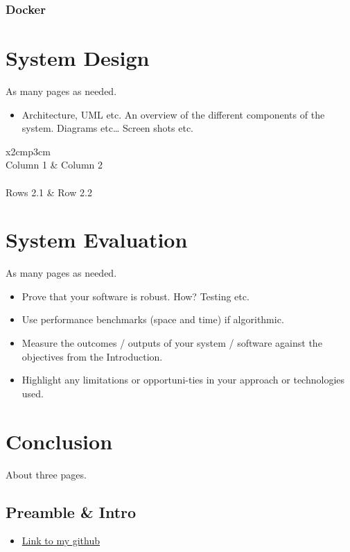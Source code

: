 \subsection{Docker}

\chapter{System Design}
As many pages as needed.
\begin{itemize}
\item Architecture, UML etc. An overview of the different components of the system. Diagrams etc… Screen shots etc.
\end{itemize}

\begin{table}[h]
  \centering
  \begin{tabular}{x{2cm}p{3cm}}
    \toprule \\
    Column 1 & Column 2 \\
    \midrule \\
    Rows 2.1 & Row 2.2 \\
    \bottomrule
  \end{tabular}
  \caption{A table.}
  \label{table:mytable}
\end{table}

\chapter{System Evaluation}
As many pages as needed.
\begin{itemize}
\item Prove that your software is robust. How? Testing etc.
\item Use performance benchmarks (space and time) if algorithmic.
\item Measure the outcomes / outputs of your system / software against the objectives from the Introduction.
\item Highlight any limitations or opportuni-ties in your approach or technologies used.
\end{itemize}

\chapter{Conclusion}
About three pages.
\begin{appendices}
\chapter{Preamble \& Intro}
\begin{itemize}
\item \href{https://github.com/Ultan-Kearns/AppliedProject}{Link to my github}
\end{itemize}
\end{appendices}



